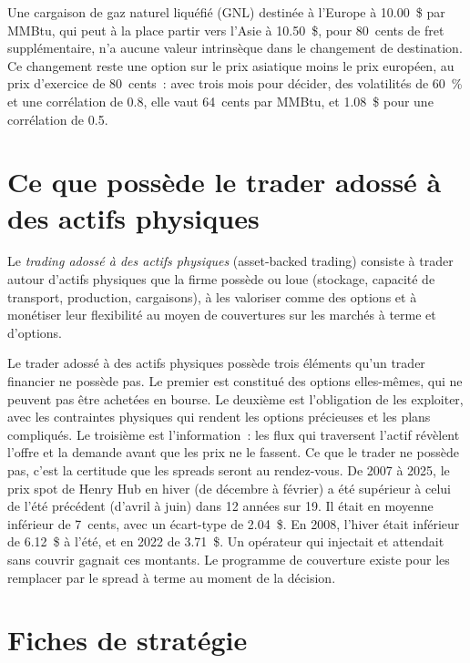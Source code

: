 Une cargaison de gaz naturel liquéfié (GNL) destinée à l'Europe à 10.00~\$ par MMBtu, qui peut à la place partir vers l'Asie à 10.50~\$, pour 80~cents de fret supplémentaire,
n'a aucune valeur intrinsèque dans le changement de destination. Ce changement reste une option sur le prix asiatique moins le prix européen, au prix d'exercice de 80~cents~: avec trois mois
pour décider, des volatilités de 60~\% et une corrélation de 0.8, elle vaut 64~cents par MMBtu, et 1.08~\$ pour une corrélation de 0.5.

\section{Ce que possède le trader adossé à des actifs physiques}

\begin{definition}\label{def:s2:storage-transport-and-physical-optionality:assetbacked}
Le \emph{trading adossé à des actifs physiques} (asset-backed trading) consiste à trader autour d'actifs physiques que la firme possède ou loue (stockage, capacité de transport,
production, cargaisons), à les valoriser comme des options et à monétiser leur flexibilité au moyen de couvertures sur les marchés à terme et d'options.
\end{definition}

Le trader adossé à des actifs physiques possède trois éléments qu'un trader financier ne possède pas. Le premier est constitué des options elles-mêmes, qui ne peuvent pas être achetées en bourse.
Le deuxième est l'obligation de les exploiter, avec les contraintes physiques qui rendent les options précieuses et les plans compliqués. Le troisième est
l'information~: les flux qui traversent l'actif révèlent l'offre et la demande avant que les prix ne le fassent. Ce que le trader ne possède pas, c'est la certitude que les spreads seront au rendez-vous.
De 2007 à 2025, le prix spot de Henry Hub en hiver (de décembre à février) a été supérieur à celui de l'été précédent (d'avril à juin) dans 12 années sur 19. Il
était en moyenne inférieur de 7~cents, avec un écart-type de 2.04~\$. En 2008, l'hiver était inférieur de 6.12~\$ à l'été, et en 2022 de 3.71~\$. Un opérateur qui injectait
et attendait sans couvrir gagnait ces montants. Le programme de couverture existe pour les remplacer par le spread à terme au moment de la décision.

\section{Fiches de stratégie}

